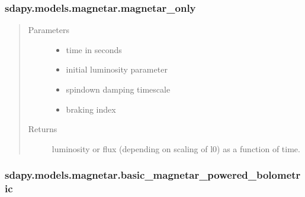 \documentclass[letterpaper,10pt,english]{sphinxmanual}
\begin{document}
\subsubsection{sdapy.models.magnetar.magnetar\_only}
\label{\detokenize{generated/sdapy.models.magnetar.magnetar_only:sdapy-models-magnetar-magnetar-only}}\label{\detokenize{generated/sdapy.models.magnetar.magnetar_only::doc}}

\begin{fulllineitems}
\label{\detokenize{generated/sdapy.models.magnetar.magnetar_only:sdapy.models.magnetar.magnetar_only}}
\begin{quote}\begin{description}
\item[{Parameters}] \leavevmode\begin{itemize}
\item {} 
 \textendash{} time in seconds

\item {} 
 \textendash{} initial luminosity parameter

\item {} 
 \textendash{} spin\sphinxhyphen{}down damping timescale

\item {} 
 \textendash{} braking index

\end{itemize}

\item[{Returns}] \leavevmode
luminosity or flux (depending on scaling of l0) as a function of time.

\end{description}\end{quote}

\end{fulllineitems}



\subsubsection{sdapy.models.magnetar.basic\_magnetar\_powered\_bolometric}
\label{\detokenize{generated/sdapy.models.magnetar.basic_magnetar_powered_bolometric:sdapy-models-magnetar-basic-magnetar-powered-bolometric}}\label{\detokenize{generated/sdapy.models.magnetar.basic_magnetar_powered_bolometric::doc}}
\end{document}

